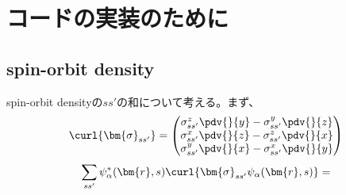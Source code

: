 \documentclass[a4paper,11pt,uplatex]{jsarticle}%
\begin{document}
\section{コードの実装のために}
\subsection{spin-orbit density}
spin-orbit densityの$ss'$の和について考える。まず、
\begin{equation}
  \curl{\bm{\sigma}_{ss'}} = 
  \begin{pmatrix}
    \sigma_{ss'}^z\pdv{}{y} - \sigma_{ss'}^y\pdv{}{z} \\
    \sigma_{ss'}^x\pdv{}{z} - \sigma_{ss'}^z\pdv{}{x} \\
    \sigma_{ss'}^y\pdv{}{x} - \sigma_{ss'}^x\pdv{}{y}
  \end{pmatrix}
\end{equation}
\begin{equation}
  \sum_{ss'}\psi^*_{\alpha}(\bm{r},s)\curl{\bm{\sigma}_{ss'}\psi_\alpha(\bm{r},s)} = 
\end{equation}
\end{document}
